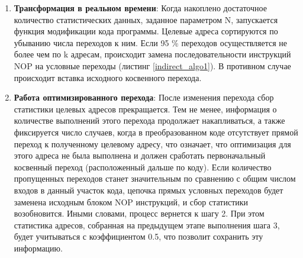 \begin{enumerate}
 	\item \textbf{Трансформация в реальном времени}: Когда накоплено достаточное количество статистических данных, заданное параметром N, запускается функция модификации кода программы. Целевые адреса сортируются по убыванию числа переходов к ним. Если 95 \% переходов осуществляется не более чем по k адресам, происходит замена последовательности инструкций NOP на условные переходы (листинг \ref{indirect_algo1}). В противном случае происходит вставка исходного косвенного перехода.
	\item \textbf{Работа оптимизированного перехода}: После изменения перехода сбор статистики целевых адресов прекращается. Тем не менее, информация о количестве выполнений этого перехода продолжает накапливаться, а также фиксируется число случаев, когда в преобразованном коде отсутствует прямой переход к полученному целевому адресу, что означает, что оптимизация для этого адреса не была выполнена и должен сработать первоначальный косвенный переход (расположенный дальше по коду). Если количество пропущенных переходов станет значительным по сравнению с общим числом входов в данный участок кода, цепочка прямых условных переходов будет заменена исходным блоком NOP инструкций, и сбор статистики возобновится. Иными словами, процесс вернется к шагу 2. При этом статистика адресов, собранная на предыдущем этапе выполнения шага 3, будет учитываться с коэффициентом 0.5, что позволит сохранить эту информацию.
 \end{enumerate}




